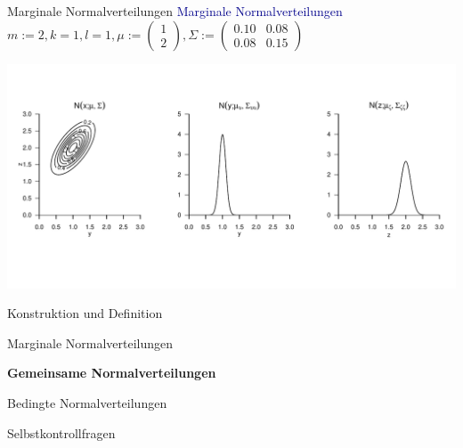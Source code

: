 \documentclass[
  8pt,
  ignorenonframetext,
]{beamer}
\begin{document}
\begin{frame}{Marginale Normalverteilungen}
\protect\hypertarget{marginale-normalverteilungen-1}{}
\textcolor{darkblue}{Marginale Normalverteilungen} \small \center
\(m := 2, k = 1, l = 1, \mu := \begin{pmatrix} 1 \\ 2 \end{pmatrix}, \Sigma := \begin{pmatrix} 0.10 & 0.08 \\ 0.08 & 0.15 \end{pmatrix}\)

\vspace{-2mm}

\begin{center}\includegraphics[width=1\linewidth]{6_Abbildungen/mvda_6_marginale_mvnorm} \end{center}
\end{frame}

\begin{frame}{}
\protect\hypertarget{section-5}{}
\large
{}
\vfill

Konstruktion und Definition

Marginale Normalverteilungen

\textbf{Gemeinsame Normalverteilungen}

Bedingte Normalverteilungen

Selbstkontrollfragen \vfill
\end{frame}
\end{document}

